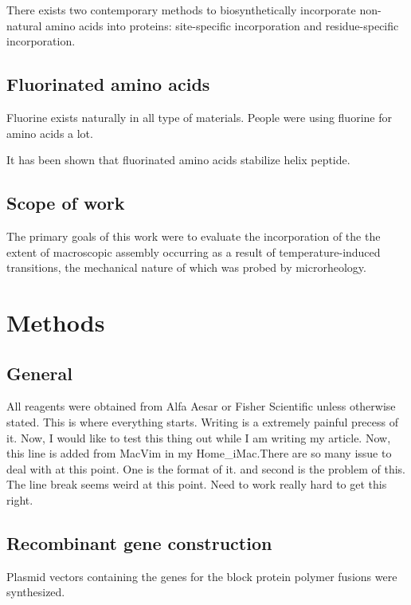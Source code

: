 \begin{refsection}
There exists two contemporary methods to biosynthetically incorporate
non-natural amino acids into proteins: site-specific incorporation and
residue-specific incorporation.

\subsection{Fluorinated amino acids}
\label{sec:faa}

Fluorine exists naturally in all type of materials. People were using fluorine
for amino acids a lot.

It has been shown that fluorinated amino acids stabilize helix peptide.

\subsection{Scope of work}

The primary goals of this work were to evaluate the incorporation of the
the extent of macroscopic assembly occurring as a result of temperature-induced
transitions, the mechanical nature of which was probed by microrheology. 

\section{Methods}

\subsection{General}

All reagents were obtained from Alfa Aesar or Fisher
Scientific unless otherwise stated. This is where everything starts. Writing is
a extremely painful precess of it. Now, I would like to test this thing out
while I am writing my article. Now, this line is added from MacVim in my
Home\_iMac.There are so many issue to deal with at this point. One is the
format of it. and second is the problem of this. The line break seems weird at
this point. Need to work really hard to get this right.

\subsection{Recombinant gene construction}

Plasmid vectors containing the genes for the block protein polymer fusions were
synthesized. 


\end{refsection}

